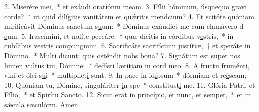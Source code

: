 2. Miserére m\uline{e}i,~* et exáudi oratiónm m\uline{e}am.
3. Fílii hóminum, úsquequo gravi c\uline{o}rde?~* ut quid dilígitis vanitátem et quǽritis mendc\uline{i}um?
4. Et scitóte quóniam mirificávit Dóminus sanctum s\uline{u}um:~* Dóminus exáudiet me cum clamávero d \uline{e}um.
5. Irascímini, et nolíte peccáre:~† quæ dícitis in córdibus v\uline{e}stris,~* in cubílibus vestris compungm\uline{i}ni.
6. Sacrificáte sacrifícium justítiæ,~† et speráte in D\uline{ó}mino.~* Multi dicunt: quis osténdit nobs b\uline{o}na?
7. Signátum est super nos lumen vultus tui, D\uline{ó}mine:~* dedísti lætítiam in cord m\uline{e}o.
8. A fructu fruménti, vini et ólei s\uline{u}i~* multiplict\uline{i} sunt.
9. In pace in id\uline{í}psum~* dórmiam et re\uline{é}scam;
10. Quóniam tu, Dómine, singuláriter \uline{i}n spe~* constitust\uline{i} me.
11. Glória Patri, et F\uline{í}lio,~* et Spirítu S\uline{a}ncto.
12. Sicut erat in princípio, et nunc, et s\uline{e}mper,~* et in sǽcula sæculórm. \uline{A}men.
